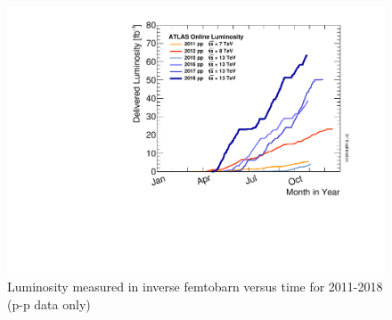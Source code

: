 \documentclass[a4paper, oneside, 11pt, openright]{book}
\begin{document}
					\begin{figure}
						\centering
						\includegraphics[width=0.5\textheight]{tesi_images/luminosity.pdf}
						\caption{Luminosity measured in inverse femtobarn versus time for 2011-2018 (p-p data only)}
						\label{fig:Integreted Luminosity}
					\end{figure}
					
\end{document}
